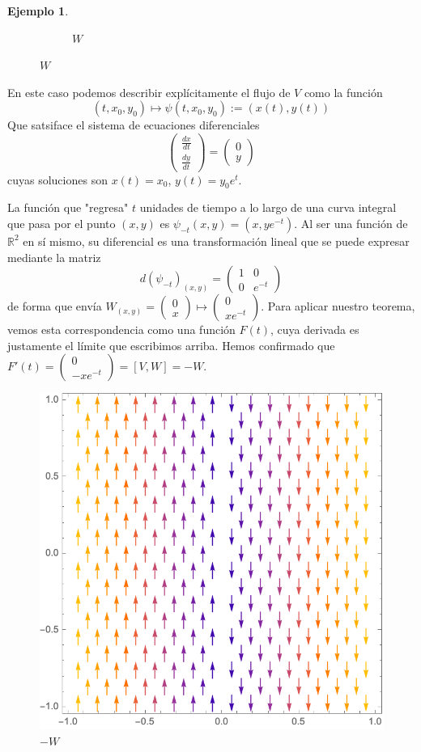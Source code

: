 \documentclass[spanish]{book}
\theoremstyle{definition}
\newtheorem*{ejem}{Ejemplo}
\newcommand{\R}{\mathbb{R}}
\begin{document}
\begin{ejem}
\begin{figure}[H]
\begin{subfigure}{0.5\linewidth}
			\caption*{$W$}
		\end{subfigure}
	\end{figure}
	En este caso podemos describir explícitamente el flujo de $V$ como la función
	\[(t,x_0,y_0)\mapsto\psi(t,x_0,y_0):=(x(t),y(t))\]
	Que satsiface el sistema de ecuaciones diferenciales
	\[\begin{pmatrix}
		\frac{dx}{dt}\\
		\frac{dy}{dt}
	\end{pmatrix}=
	\begin{pmatrix}
		0\\
		y
	\end{pmatrix}\]
	cuyas soluciones son $x(t)=x_0$, $y(t)=y_0e^t$.
	
	La función que "regresa" $t$ unidades de tiempo a lo largo de una curva integral que pasa por el punto $(x,y)$ es $\psi_{-t}(x,y)=(x,ye^{-t})$. Al ser una función de $\R^2$ en sí mismo, su diferencial es una transformación lineal que se puede expresar mediante la matriz
	\[d(\psi_{-t})_{(x,y)}=\begin{pmatrix}
		1&0\\
		0&e^{-t}
	\end{pmatrix}\]
	de forma que envía $W_{(x,y)}=\begin{pmatrix}0\\x\end{pmatrix}\mapsto\begin{pmatrix}0\\xe^{-t}\end{pmatrix}$. Para aplicar nuestro teorema, vemos esta correspondencia como una función $F(t)$, cuya derivada es justamente el límite que escribimos arriba. Hemos confirmado que
	$F'(t)=\begin{pmatrix}
		0\\-xe^{-t}
	\end{pmatrix}=[V,W]=-W$.
	\begin{figure}[H]
		\centering
		\includegraphics[width=0.45\linewidth]{fig8}
		\caption*{$-W$}
	\end{figure}
\end{ejem}
\end{document}
